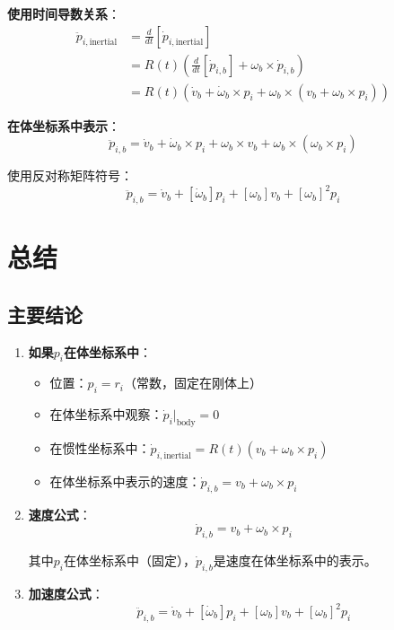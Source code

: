 \documentclass[12pt,a4paper]{article}
\begin{document}
\textbf{使用时间导数关系}：
\begin{align}
\ddot{p}_{i,\text{inertial}} &= \frac{d}{dt}[\dot{p}_{i,\text{inertial}}] \\
&= R(t) \left(\frac{d}{dt}[\dot{p}_{i,b}] + \omega_b \times \dot{p}_{i,b}\right) \\
&= R(t) \left(\dot{v}_b + \dot{\omega}_b \times p_i + \omega_b \times (v_b + \omega_b \times p_i)\right)
\end{align}

\textbf{在体坐标系中表示}：
\begin{equation}
\ddot{p}_{i,b} = \dot{v}_b + \dot{\omega}_b \times p_i + \omega_b \times v_b + \omega_b \times (\omega_b \times p_i)
\end{equation}

使用反对称矩阵符号：
\begin{equation}
\ddot{p}_{i,b} = \dot{v}_b + [\dot{\omega}_b] p_i + [\omega_b] v_b + [\omega_b]^2 p_i
\label{eq:acceleration_body_frame}
\end{equation}

\section{总结}

\subsection{主要结论}

\begin{enumerate}
\item \textbf{如果$p_i$在体坐标系中}：
\begin{itemize}
\item 位置：$p_i = r_i$（常数，固定在刚体上）
\item 在体坐标系中观察：$\dot{p}_i\Big|_{\text{body}} = 0$
\item 在惯性坐标系中：$\dot{p}_{i,\text{inertial}} = R(t) (v_b + \omega_b \times p_i)$
\item 在体坐标系中表示的速度：$\dot{p}_{i,b} = v_b + \omega_b \times p_i$
\end{itemize}

\item \textbf{速度公式}：
\begin{equation}
\dot{p}_{i,b} = v_b + \omega_b \times p_i
\end{equation}

其中$p_i$在体坐标系中（固定），$\dot{p}_{i,b}$是速度在体坐标系中的表示。

\item \textbf{加速度公式}：
\begin{equation}
\ddot{p}_{i,b} = \dot{v}_b + [\dot{\omega}_b] p_i + [\omega_b] v_b + [\omega_b]^2 p_i
\end{equation}
\end{enumerate}
\end{document}
